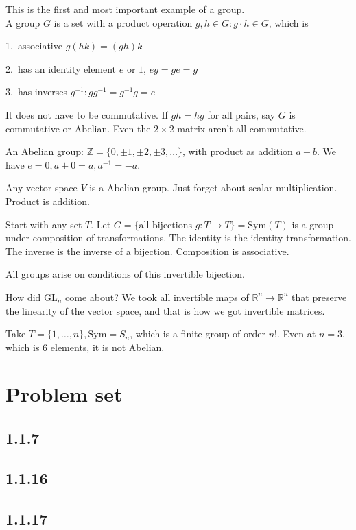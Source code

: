 \documentclass[12pt]{article}
\newcommand{\RR}{\mathbb{R}}
\newcommand{\GL}{\text{GL}}
\newcommand{\inv}[1]{#1^{-1}}
\theoremstyle{definition}
\begin{document}
This is the first and most important example of a group. \\

A group \(G\) is a set with a product operation \(g,h\in G: g\cdot h\in G\), which is

1.\ associative \(g(hk) = (gh)k\)

2.\ has an identity element \(e\) or \(1\), \(eg=ge=g\)

3.\ has inverses \(\inv{g}: g\inv{g}=\inv{g}g=e\)

It does not have to be commutative. If \(gh=hg\) for all pairs, say \(G\) is commutative or Abelian.
Even the \(2 \times 2\) matrix aren't all commutative.

An Abelian group: \(\mathbb{Z} = \{0, \pm1, \pm2, \pm3, \ldots \} \),
with product as addition \(a + b\). We have \(e = 0, a+0=a, \inv{a}=-a\).

Any vector space \(V\) is a Abelian group. Just forget about scalar multiplication. Product is addition.

Start with any set \(T\). Let \(G = \{\text{all bijections } g:T\rightarrow T\}=\text{Sym}(T)\)
is a group under composition of transformations. The identity is the identity transformation.
The inverse is the inverse of a bijection. Composition is associative.

All groups arise on conditions of this invertible bijection.

How did \(\GL_n\) come about? We took all invertible maps of \(\RR^n\rightarrow\RR^n\) that
preserve the linearity of the vector space, and that is how we got invertible matrices.

Take \(T=\{1,\ldots,n\},\text{Sym}=S_n\), which is a finite group of order \(n!\).
Even at \(n=3\), which is 6 elements, it is not Abelian.

\section{Problem set}
\subsection{1.1.7}
\subsection{1.1.16}
\subsection{1.1.17}
\end{document}
